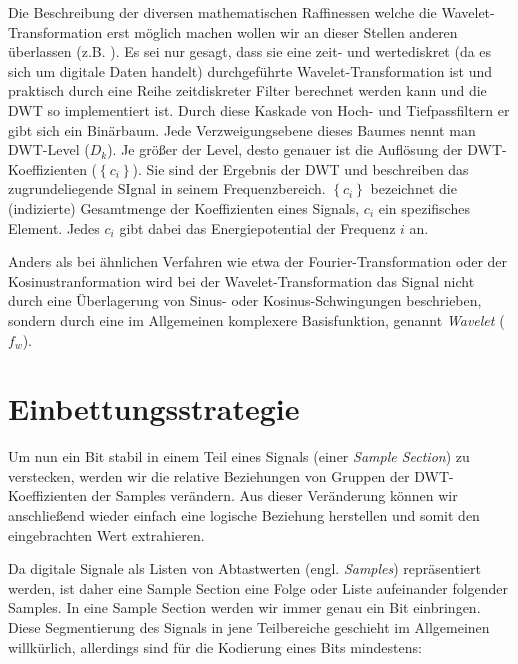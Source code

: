 Die Beschreibung der diversen mathematischen Raffinessen welche die Wavelet\--Trans\-formation erst m\"oglich machen wollen wir an dieser Stellen anderen \"uberlassen (z.B. \cite{polikar1996engineer}). Es sei nur gesagt, dass sie eine zeit- und wertediskret (da es sich um digitale Daten handelt) durchgef\"uhrte Wavelet-\-Trans\-formation ist und praktisch durch eine Reihe zeitdiskreter Filter berechnet werden kann und die DWT so implementiert ist. Durch diese Kaskade von Hoch- und Tiefpassfiltern er gibt sich ein Binärbaum. Jede Verzweigungsebene dieses Baumes nennt man DWT-Level (${D}_{k}$). Je größer der Level, desto genauer ist die Auflösung der DWT-Koeffizienten ($\left\{{c}_{i}\right\}$). Sie sind der Ergebnis der DWT und beschreiben das zugrundeliegende SIgnal in seinem Frequenzbereich. $\left\{{c}_{i}\right\}$ bezeichnet die (indizierte) Gesamtmenge der Koeffizienten eines Signals, $c_i$ ein spezifisches Element. Jedes $c_i$ gibt dabei das Energiepotential der Frequenz $i$ an. 

Anders als bei \"ahnlichen Verfahren wie etwa der Fourier-\-Transformation oder der Kosinus\-tranformation wird bei der Wavelet-Transformation das Signal nicht durch eine Überlagerung von Sinus- oder Kosinus-Schwingungen beschrieben, sondern durch eine im Allgemeinen komplexere Basisfunktion, genannt \textit{Wavelet} (${f}_{w}$).


\section{Einbettungsstrategie}
\label{sec:embeddingstragety}

Um nun ein Bit stabil in einem Teil eines Signals (einer \textit{Sample Section}) zu verstecken, werden wir die relative Beziehungen von Gruppen der DWT-Koeffizienten der Samples verändern. Aus dieser Veränderung können wir anschließend wieder einfach eine logische Beziehung herstellen und somit den eingebrachten Wert extrahieren. 

Da digitale Signale als Listen von Abtastwerten (engl. \textit{Samples}) repräsentiert werden, ist daher eine Sample Section eine Folge oder Liste aufeinander folgender Samples. In eine Sample Section werden wir immer genau ein Bit einbringen. Diese Segmentierung des Signals in jene Teilbereiche geschieht im Allgemeinen willkürlich, allerdings sind für die Kodierung eines Bits mindestens:

